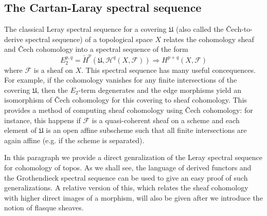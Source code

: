 \subsection{The Cartan-Laray spectral sequence}
The classical Leray spectral sequence for a covering $\mathfrak{U}$ (also called the \v{C}ech-to-derive spectral sequence) of a topological space $X$ relates the cohomology sheaf and \v{C}ech cohomology into a spectral sequence of the form
\begin{equation*}
E_2^{p,q}=\check{H}^p(\mathfrak{U},\mathcal{H}^q(X,\mathscr{F}))\Rightarrow H^{p+q}(X,\mathscr{F})
\end{equation*}
where $\mathscr{F}$ is a sheaf on $X$. This spectral sequence has many useful concequences. For example, if the cohomology vanishes for any finite intersections of the covering $\mathfrak{U}$, then the $E_2$-term degenerates and the edge morphisms yield an isomorphism of \v{C}ech cohomology for this covering to sheaf cohomology. This provides a method of computing sheaf cohomology using \v{C}ech cohomology: for instance, this happens if $\mathscr{F}$ is a quasi-coherent sheaf on a scheme and each element of $\mathfrak{U}$ is an open affine subscheme such that all finite intersections are again affine (e.g. if the scheme is separated).\par
In this paragraph we provide a direct genralization of the Leray spectral sequence for cohomology of topos. As we shall see, the language of derived functors and the Grothendieck spectral sequence can be used to give an easy proof of such generalizations. A relative version of this, which relates the sheaf cohomology with higher direct images of a morphism, will also be given after we introduce the notion of flasque sheaves.

